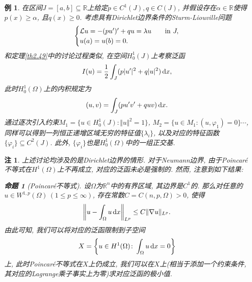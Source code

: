 \documentclass[12pt,a4paper]{article}
\newtheorem{proposition}[theorem]{命题}
\newtheorem{example}[theorem]{例}
\newtheorem{remark}[theorem]{注}
\begin{document}
\begin{example}
    在区间$J = [a, b] \subseteq \mathbb{R}$上给定$p \in C^1(J), q \in C(J)$, 并假设存在$\alpha \in \mathbb{R}$使得$p(x) \geq \alpha$, 且$q(x) \geq 0$.
    考虑具有Dirichlet边界条件的Sturm-Liouville问题 
    \begin{equation*}
        \begin{cases}
            \mathcal{L}u = -(pu')' + qu = \lambda u \quad &{\rm in}\ J, \\ 
            u(a) = u(b) = 0.
        \end{cases}
    \end{equation*}
    和定理\ref{th2.49}中的讨论过程类似, 在空间$H_0^1(J)$上考察泛函 
    \begin{equation*}
        I(u) = \frac{1}{2}\int_J(p|u'|^2 + q|u|^2) \,{\rm d}x,
    \end{equation*}
    此时$H_0^1(\Omega)$上的内积规定为 
    \begin{equation*}
        (u, v) = \int_J(pu'v' + quv) \,{\rm d}x.
    \end{equation*}
    通过逐次引入约束$M_1 = \{u \in H_0^1(J)\colon \Vert u \Vert^2 = 1\}$, $M_2 = \{u \in M_1\colon (u, \varphi_1) = 0\} \cdots$, 同样可以得到一列恒正递增区域无穷的特征值$\{\lambda_i\}$, 以及对应的特征函数$\{\varphi_i\} \subseteq C^2(J)$.
    此外, $\{\varphi_i\}$也是$H_0^1(\Omega)$中的一组正交基.
\end{example}

\begin{remark}
    上述讨论均涉及的是Dirichlet边界的情形. 对于Neumann边界, 由于Poincar\'e不等式在$H^1(\Omega)$上不再成立, 对应的泛函未必是强制的.
    然而, 注意到如下结果:
    \begin{proposition}[Poincaré不等式]
        设$\Omega$为$\mathbb{R}^n$中的有界区域, 其边界是$C^1$的. 那么对任意的$u \in W^{1, p}(\Omega)\ (1 \leq p \leq \infty)$, 存在常数$C = C(n, p, \Omega) > 0$, 使得 
        \begin{equation*}
            \left\Vert u - \int_{\Omega}u \,{\rm d}x \right\Vert_{L^p} \leq C\Vert \nabla u \Vert_{L^p}.
        \end{equation*}
        由此可知, 我们可以将对应的泛函限制到子空间 
        \begin{equation*}
            X = \left\{u \in H^1(\Omega)\colon \int_{\Omega}u \,{\rm d}x = 0\right\}
        \end{equation*}
        上, 此时Poincaré不等式在$X$上仍成立, 我们可以在$X$上(相当于添加一个约束条件, 其对应的Lagrange乘子事实上为零)求对应泛函的极小值.
    \end{proposition}
\end{remark}
\end{document}
